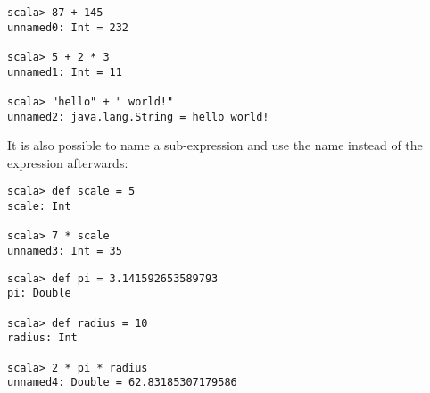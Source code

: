





\begin{lstlisting}
scala> 87 + 145
unnamed0: Int = 232

scala> 5 + 2 * 3
unnamed1: Int = 11

scala> "hello" + " world!"
unnamed2: java.lang.String = hello world!
\end{lstlisting}
It is also possible to name a sub-expression and use the name instead
of the expression afterwards:
\begin{lstlisting}
scala> def scale = 5
scale: Int

scala> 7 * scale
unnamed3: Int = 35
\end{lstlisting}
\begin{lstlisting}
scala> def pi = 3.141592653589793
pi: Double

scala> def radius = 10
radius: Int

scala> 2 * pi * radius
unnamed4: Double = 62.83185307179586
\end{lstlisting}

